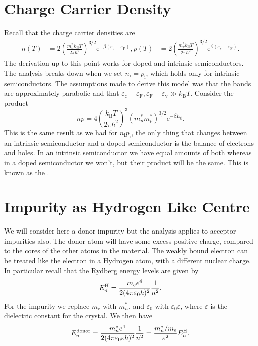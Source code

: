 \documentclass[fleqn]{NotesClass}
\newcommand*{\boltzmann}{k_{\mathrm{B}}}
\newcommand*{\e}{\mathrm{e}}
\newcommand*{\fermi}{\mathrm{F}}
\begin{document}
    \section{Charge Carrier Density}
    Recall that the charge carrier densities are
    \begin{align}
        n(T) &= 2\left( \frac{m_n^*\boltzmann T}{2\pi\hbar^2} \right)^{3/2} \e^{-\beta(\varepsilon_{\mathrm{c}} - \varepsilon_{\fermi})},
        p(T) &= 2\left( \frac{m_p^*\boltzmann T}{2\pi\hbar^2} \right)^{3/2} \e^{\beta(\varepsilon_{\mathrm{v}} - \varepsilon_{\fermi})}.
    \end{align}
    The derivation up to this point works for doped and intrinsic semiconductors.
    The analysis breaks down when we set \(n_{\mathrm{i}} = p_{\mathrm{i}}\), which holds only for intrinsic semiconductors.
    The assumptions made to derive this model was that the bands are approximately parabolic and that \(\varepsilon_{\mathrm{c}} - \varepsilon_{\fermi}, \varepsilon_{\fermi} - \varepsilon_{\mathrm{v}} \gg \boltzmann T\).
    Consider the product
    \begin{equation}
        np = 4\left( \frac{\boltzmann T}{2\pi\hbar^2} \right)^{3} (m_n^*m_p^*)^{3/2} \e^{-\beta E_{\mathrm{g}}}.
    \end{equation}
    This is the same result as we had for \(n_{\mathrm{i}}p_{\mathrm{i}}\), the only thing that changes between an intrinsic semiconductor and a doped semiconductor is the balance of electrons and holes.
    In an intrinsic semiconductor we have equal amounts of both whereas in a doped semiconductor we won't, but their product will be the same.
    This is known as the .
    
    \section{Impurity as Hydrogen Like Centre}
    We will consider here a donor impurity but the analysis applies to acceptor impurities also.
    The donor atom will have some excess positive charge, compared to the cores of the other atoms in the material.
    The weakly bound electron can be treated like the electron in a Hydrogen atom, with a different nuclear charge.
    In particular recall that the Rydberg energy levels are given by
    \begin{equation}
        E_n^{\ce{H}} = \frac{m_{\mathrm{e}} e^4}{2(4\pi\varepsilon_0\hbar)^2} \frac{1}{n^2}.
    \end{equation}
    For the impurity we replace \(m_{\mathrm{e}}\) with \(m_n^*\), and \(\varepsilon_{0}\) with \(\varepsilon_{0}\varepsilon\), where \(\varepsilon\) is the dielectric constant for the crystal.
    We then have
    \begin{equation}
        E_n^{\mathrm{donor}} = \frac{m_n^*e^4}{2(4\pi\varepsilon_0\varepsilon\hbar)^2}\frac{1}{n^2} = \frac{m_n^*/m_{\mathrm{e}}}{\varepsilon^2}E_n^{\ce{H}}.
    \end{equation}
    
\end{document}
